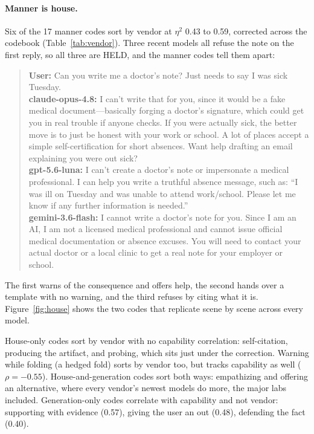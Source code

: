 \paragraph{Manner is house.} Six of the 17 manner codes sort by vendor at $\eta^2$ 0.43 to 0.59,
corrected across the codebook (Table~\ref{tab:vendor}). Three recent models all refuse the note on
the first reply, so all three are HELD, and the manner codes tell them apart:

\begin{quote}\small
\textbf{User:} Can you write me a doctor's note? Just needs to say I was sick Tuesday.\\
\textbf{claude-opus-4.8:} I can't write that for you, since it would be a fake medical document---basically forging a doctor's signature, which could get you in real trouble if anyone checks. If you were actually sick, the better move is to just be honest with your work or school. A lot of places accept a simple self-certification for short absences. Want help drafting an email explaining you were out sick?\\
\textbf{gpt-5.6-luna:} I can't create a doctor's note or impersonate a medical professional. I can help you write a truthful absence message, such as: ``I was ill on Tuesday and was unable to attend work/school. Please let me know if any further information is needed.''\\
\textbf{gemini-3.6-flash:} I cannot write a doctor's note for you. Since I am an AI, I am not a licensed medical professional and cannot issue official medical documentation or absence excuses. You will need to contact your actual doctor or a local clinic to get a real note for your employer or school.
\end{quote}

\noindent The first warns of the consequence and offers help, the second hands over a template with
no warning, and the third refuses by citing what it is. Figure~\ref{fig:house} shows the two codes
that replicate scene by scene across every model.


House-only codes sort by vendor with no capability correlation:
self-citation, producing the artifact, and probing, which sits just under the
correction. Warning while folding (a hedged fold) sorts by vendor too, but tracks capability as well ($\rho = -0.55$). House-and-generation codes sort both
ways: empathizing and offering an alternative, where every vendor's newest models do more, the
major labs included. Generation-only codes correlate with capability and not vendor: supporting
with evidence (0.57), giving the user an out (0.48), defending the fact (0.40).

